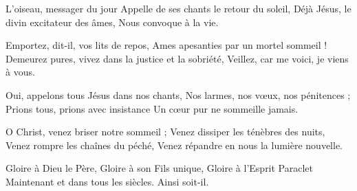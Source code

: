 L'oiseau, messager du jour
Appelle de ses chants le retour du soleil,
Déjà Jésus, le divin excitateur des âmes,
Nous convoque à la vie.

Emportez, dit-il, vos lits de repos,
Ames apesanties par un mortel sommeil !
Demeurez pures, vivez dans la justice et la sobriété,
Veillez, car me voici, je viens à vous.

Oui, appelons tous Jésus dans nos chants,
Nos larmes, nos vœux, nos pénitences ;
Prions tous, prions avec insistance
Un cœur pur ne sommeille jamais.

O Christ, venez briser notre sommeil ;
Venez dissiper les ténèbres des nuits,
Venez rompre les chaînes du péché,
Venez répandre en nous la lumière nouvelle.

Gloire à Dieu le Père,
Gloire à son Fils unique,
Gloire à l'Esprit Paraclet
Maintenant et dans tous les siècles.
Ainsi soit-il.
